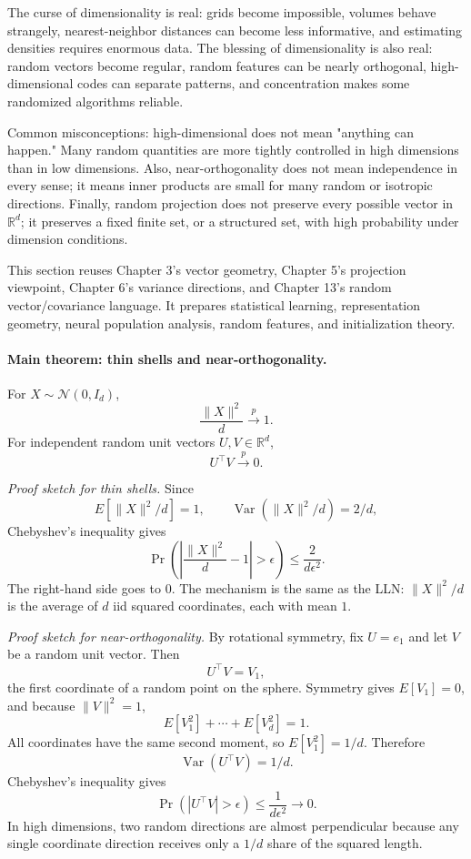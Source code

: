 The curse of dimensionality is real: grids become impossible, volumes behave strangely, nearest-neighbor distances can become less informative, and estimating densities requires enormous data. The blessing of dimensionality is also real: random vectors become regular, random features can be nearly orthogonal, high-dimensional codes can separate patterns, and concentration makes some randomized algorithms reliable.

Common misconceptions: high-dimensional does not mean "anything can happen." Many random quantities are more tightly controlled in high dimensions than in low dimensions. Also, near-orthogonality does not mean independence in every sense; it means inner products are small for many random or isotropic directions. Finally, random projection does not preserve every possible vector in \(\mathbb R^d\); it preserves a fixed finite set, or a structured set, with high probability under dimension conditions.

This section reuses Chapter 3's vector geometry, Chapter 5's projection viewpoint, Chapter 6's variance directions, and Chapter 13's random vector/covariance language. It prepares statistical learning, representation geometry, neural population analysis, random features, and initialization theory.

\paragraph{Main theorem: thin shells and near-orthogonality.}
For \(X\sim\mathcal N(0,I_d)\),
\[
\frac{\|X\|^2}{d}\xrightarrow{p}1.
\]
For independent random unit vectors \(U,V\in\mathbb R^d\),
\[
U^\top V\xrightarrow{p}0.
\]

\emph{Proof sketch for thin shells.}
Since
\[
E[\|X\|^2/d]=1,
\qquad
\operatorname{Var}(\|X\|^2/d)=2/d,
\]
Chebyshev's inequality gives
\[
\Pr\!\left(\left|\frac{\|X\|^2}{d}-1\right|>\epsilon\right)
\leq
\frac{2}{d\epsilon^2}.
\]
The right-hand side goes to \(0\). The mechanism is the same as the LLN: \(\|X\|^2/d\) is the average of \(d\) iid squared coordinates, each with mean \(1\).

\emph{Proof sketch for near-orthogonality.}
By rotational symmetry, fix \(U=e_1\) and let \(V\) be a random unit vector. Then
\[
U^\top V=V_1,
\]
the first coordinate of a random point on the sphere. Symmetry gives \(E[V_1]=0\), and because \(\|V\|^2=1\),
\[
E[V_1^2]+\cdots+E[V_d^2]=1.
\]
All coordinates have the same second moment, so \(E[V_1^2]=1/d\). Therefore
\[
\operatorname{Var}(U^\top V)=1/d.
\]
Chebyshev's inequality gives
\[
\Pr(|U^\top V|>\epsilon)\leq\frac{1}{d\epsilon^2}\to0.
\]
In high dimensions, two random directions are almost perpendicular because any single coordinate direction receives only a \(1/d\) share of the squared length.

